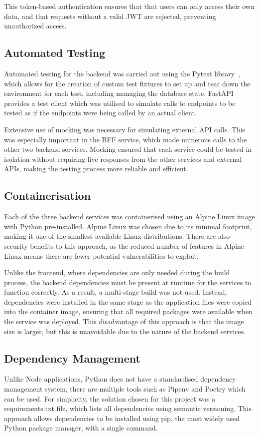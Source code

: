 This token-based authentication ensures that that users can only access their own data, and that requests without a valid JWT are rejected, preventing unauthorized access.

\subsection{Automated Testing}
Automated testing for the backend was carried out using the Pytest library~\cite{PyTest}, which allows for the creation of custom test fixtures to set up and tear down the environment for each test, including managing the database state. FastAPI provides a test client which was utilised to simulate calls to endpoints to be tested as if the endpoints were being called by an actual client.

Extensive use of mocking was necessary for simulating external API calls. This was especially important in the BFF service, which made numerous calls to the other two backend services. Mocking ensured that each service could be tested in isolation without requiring live responses from the other services and  external APIs, making the testing process more reliable and efficient.

\subsection{Containerisation}
Each of the three backend services was containerised using an Alpine Linux image with Python pre-installed. Alpine Linux was chosen due to its minimal footprint, making it one of the smallest available Linux distributions. There are also security benefits to this approach, as the reduced number of features in Alpine Linux means there are fewer potential vulnerabilities to exploit.

Unlike the frontend, where dependencies are only needed during the build process, the backend dependencies must be present at runtime for the services to function correctly. As a result, a multi-stage build was not used. Instead, dependencies were installed in the same stage as the application files were copied into the container image, ensuring that all required packages were available when the service was deployed. This disadvantage of this approach is that the image size is larger, but this is unavoidable due to the nature of the backend services.

\subsection{Dependency Management}
Unlike Node applications, Python does not have a standardised dependency management system, there are multiple tools such as Pipenv and Poetry which can be used. For simplicity, the solution chosen for this project was a requirements.txt file, which lists all dependencies using semantic versioning. This approach allows dependencies to be installed using pip, the most widely used Python package manager, with a single command.

